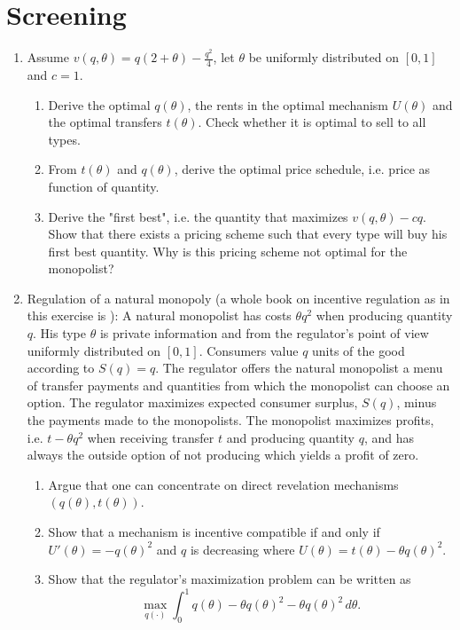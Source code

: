 \documentclass[a4paper,12pt]{article}
\begin{document}
\section{Screening}
\label{sec:screening}

\begin{enumerate}
\item Assume $v(q,\theta)=q(2+\theta)-\frac{q^{2}}{4}$, let $\theta$ be uniformly distributed on $[0,1]$ and $c=1$.
  \begin{enumerate}
  \item Derive the optimal $q(\theta)$, the rents in the optimal
    mechanism $U(\theta)$ and the optimal transfers $t(\theta)$. Check
    whether it is optimal to sell to all types.
   \item From $t(\theta)$ and $q(\theta)$, derive the optimal price schedule, i.e. price as function of quantity.
   \item Derive the "first best", i.e. the quantity that maximizes
    $v(q,\theta)-c q$. Show that there exists a pricing scheme such that
    every type will buy his first best quantity. Why is this pricing
    scheme not optimal for the monopolist?
\end{enumerate}
\item Regulation of a natural monopoly (a whole book on incentive regulation as in this exercise is \cite{laffont1993theory}): A natural monopolist has costs $\theta q^2$ when producing quantity $q$. His type $\theta $ is private information and from the regulator's point of view uniformly distributed on $[0,1]$. Consumers value $q$ units of the good according to $S(q)=q$. The regulator offers the natural monopolist a menu of transfer payments and quantities from which the monopolist can choose an option. The regulator maximizes expected consumer surplus, $S(q)$, minus the payments made to the monopolists. The monopolist maximizes profits, i.e. $t-\theta  q^2$ when receiving transfer $t$ and producing quantity $q$, and has always the outside option of not producing which yields a profit of zero.
  \begin{enumerate}
  \item Argue that one can concentrate on direct revelation mechanisms $(q(\theta ),t(\theta ))$.
  \item Show that a mechanism is incentive compatible if and only if $U'(\theta )=-q(\theta )^2$ and $q$ is decreasing where $U(\theta )=t(\theta )-\theta q(\theta )^2$.
  \item Show that the regulator's maximization problem can be written as $$\max_{q(\cdot)}\int_0^1 q(\theta )-\theta q(\theta )^2-\theta q(\theta )^2\,d\theta. $$

\end{enumerate}
\end{enumerate}
\end{document}
